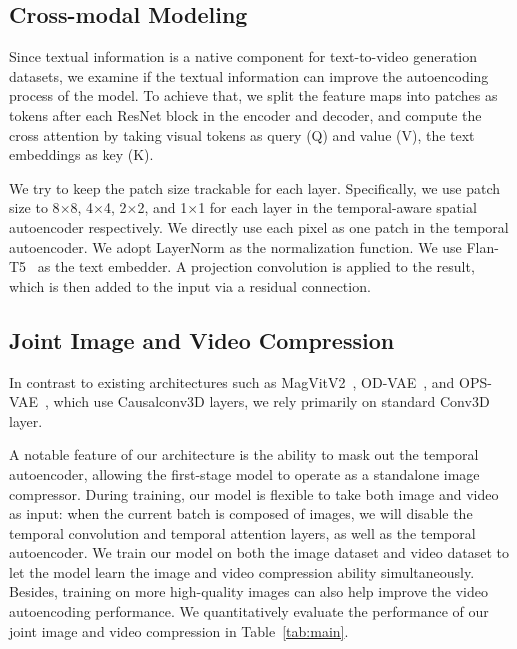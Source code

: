 \subsection{Cross-modal Modeling}
Since textual information is a native component for text-to-video generation datasets, we examine if the textual information can improve the autoencoding process of the model. To achieve that, we split the feature maps into patches as tokens after each ResNet block in the encoder and decoder, and compute the cross attention by taking visual tokens as query (Q) and value (V), the text embeddings as key (K). 

We try to keep the patch size trackable for each layer. Specifically, we use patch size to 8$\times$8, 4$\times$4, 2$\times$2, and 1$\times$1 for each layer in the temporal-aware spatial autoencoder respectively. We directly use each pixel as one patch in the temporal autoencoder.  We adopt LayerNorm as the normalization function. We use Flan-T5~\cite{t5} as the text embedder. 
A projection convolution is applied to the result, which is then added to the input via a residual connection. 



\subsection{Joint Image and Video Compression}
In contrast to existing architectures such as MagVitV2~\cite{yu2023language}, OD-VAE~\cite{chen2024odvaeomnidimensionalvideocompressor}, and OPS-VAE~\cite{opensora}, which use Causalconv3D layers, we rely primarily on standard Conv3D layer. 


A notable feature of our architecture is the ability to mask out the temporal autoencoder, allowing the first-stage model to operate as a standalone image compressor. 
During training, our model is flexible to take both image and video as input: when the current batch is composed of images, we will disable the temporal convolution and temporal attention layers, as well as the temporal autoencoder. We train our model on both the image dataset and video dataset to let the model learn the image and video compression ability simultaneously. Besides, training on more high-quality images can also help improve the video autoencoding performance. We quantitatively evaluate the performance of our joint image and video compression in Table~\ref{tab:main}. 




